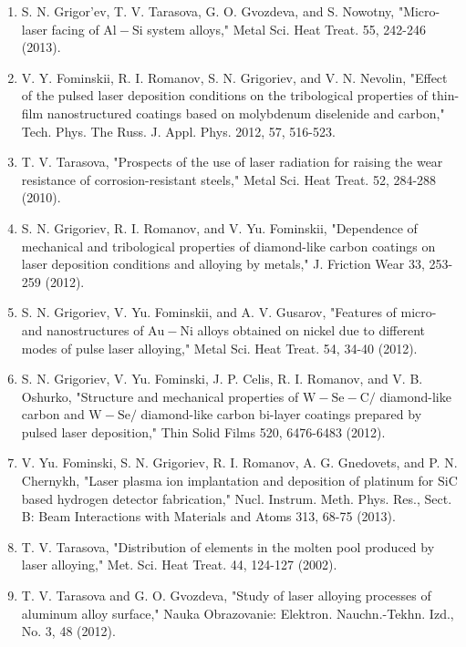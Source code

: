 \documentclass[10pt]{article}
\begin{document}
\begin{enumerate}
  \item S. N. Grigor'ev, T. V. Tarasova, G. O. Gvozdeva, and S. Nowotny, "Micro-laser facing of $\mathrm{Al}-\mathrm{Si}$ system alloys," Metal Sci. Heat Treat. 55, 242-246 (2013).

  \item V. Y. Fominskii, R. I. Romanov, S. N. Grigoriev, and V. N. Nevolin, "Effect of the pulsed laser deposition conditions on the tribological properties of thin-film nanostructured coatings based on molybdenum diselenide and carbon," Tech. Phys. The Russ. J. Appl. Phys. 2012, 57, 516-523.

  \item T. V. Tarasova, "Prospects of the use of laser radiation for raising the wear resistance of corrosion-resistant steels," Metal Sci. Heat Treat. 52, 284-288 (2010).

  \item S. N. Grigoriev, R. I. Romanov, and V. Yu. Fominskii, "Dependence of mechanical and tribological properties of diamond-like carbon coatings on laser deposition conditions and alloying by metals," J. Friction Wear 33, 253-259 (2012).

  \item S. N. Grigoriev, V. Yu. Fominskii, and A. V. Gusarov, "Features of micro- and nanostructures of $\mathrm{Au}-\mathrm{Ni}$ alloys obtained on nickel due to different modes of pulse laser alloying," Metal Sci. Heat Treat. 54, 34-40 (2012).

  \item S. N. Grigoriev, V. Yu. Fominski, J. P. Celis, R. I. Romanov, and V. B. Oshurko, "Structure and mechanical properties of $\mathrm{W}-\mathrm{Se}-\mathrm{C} /$ diamond-like carbon and $\mathrm{W}-\mathrm{Se} /$ diamond-like carbon bi-layer coatings prepared by pulsed laser deposition," Thin Solid Films 520, 6476-6483 (2012).

  \item V. Yu. Fominski, S. N. Grigoriev, R. I. Romanov, A. G. Gnedovets, and P. N. Chernykh, "Laser plasma ion implantation and deposition of platinum for $\mathrm{SiC}$ based hydrogen detector fabrication," Nucl. Instrum. Meth. Phys. Res., Sect. B: Beam Interactions with Materials and Atoms 313, 68-75 (2013).

  \item T. V. Tarasova, "Distribution of elements in the molten pool produced by laser alloying," Met. Sci. Heat Treat. 44, 124-127 (2002).

  \item T. V. Tarasova and G. O. Gvozdeva, "Study of laser alloying processes of aluminum alloy surface," Nauka Obrazovanie: Elektron. Nauchn.-Tekhn. Izd., No. 3, 48 (2012).


\end{enumerate}
\end{document}
